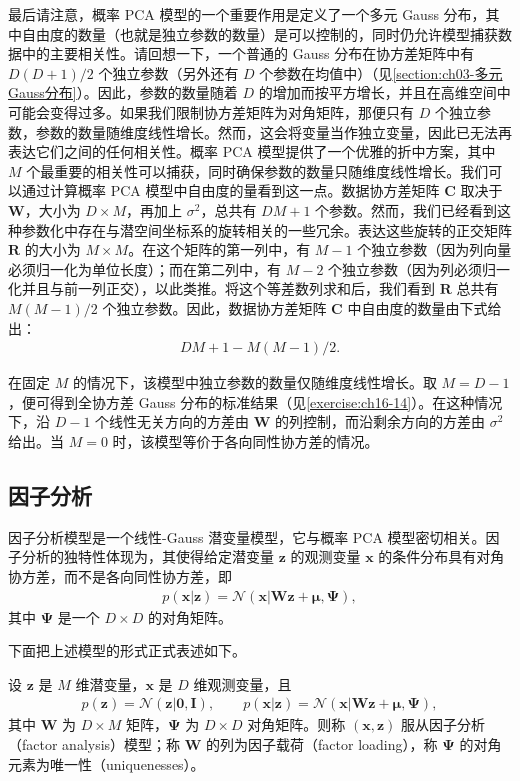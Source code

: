 \documentclass[../../main.tex]{subfiles}
\begin{document}
最后请注意，概率 PCA 模型的一个重要作用是定义了一个多元 Gauss 分布，其中自由度的数量（也就是独立参数的数量）是可以控制的，同时仍允许模型捕获数据中的主要相关性。请回想一下，一个普通的 Gauss 分布在协方差矩阵中有 $D(D+1)/2$ 个独立参数（另外还有 $D$ 个参数在均值中）（见\cref{section:ch03-多元Gauss分布}）。因此，参数的数量随着 $D$ 的增加而按平方增长，并且在高维空间中可能会变得过多。如果我们限制协方差矩阵为对角矩阵，那便只有 $D$ 个独立参数，参数的数量随维度线性增长。然而，这会将变量当作独立变量，因此已无法再表达它们之间的任何相关性。概率 PCA 模型提供了一个优雅的折中方案，其中 $M$ 个最重要的相关性可以捕获，同时确保参数的数量只随维度线性增长。我们可以通过计算概率 PCA 模型中自由度的量看到这一点。数据协方差矩阵 $\bm{C}$ 取决于 $\bm{W}$，大小为 $D\times M$，再加上 $\sigma^2$，总共有 $DM+1$ 个参数。然而，我们已经看到这种参数化中存在与潜空间坐标系的旋转相关的一些冗余。表达这些旋转的正交矩阵 $\bm{R}$ 的大小为 $M\times M$。在这个矩阵的第一列中，有 $M-1$ 个独立参数（因为列向量必须归一化为单位长度）；而在第二列中，有 $M-2$ 个独立参数（因为列必须归一化并且与前一列正交），以此类推。将这个等差数列求和后，我们看到 $\bm{R}$ 总共有 $M(M-1)/2$ 个独立参数。因此，数据协方差矩阵 $\bm{C}$ 中自由度的数量由下式给出：
\begin{align}
  DM+1-M(M-1)/2.
  \label{align:ch16-参数计数}
\end{align}

在固定 $M$ 的情况下，该模型中独立参数的数量仅随维度线性增长。取 $M=D-1$，便可得到全协方差 Gauss 分布的标准结果（见\cref{exercise:ch16-14}）。在这种情况下，沿 $D-1$ 个线性无关方向的方差由 $\bm{W}$ 的列控制，而沿剩余方向的方差由 $\sigma^2$ 给出。当 $M=0$ 时，该模型等价于各向同性协方差的情况。

\subsection{因子分析}\label{subsection:ch16-因子分析}

因子分析模型是一个线性-Gauss 潜变量模型，它与概率 PCA 模型密切相关。因子分析的独特性体现为，其使得给定潜变量 $\bm{z}$ 的观测变量 $\bm{x}$ 的条件分布具有对角协方差，而不是各向同性协方差，即
\begin{align}
  p(\bm{x}|\bm{z})=\mathcal{N}(\bm{x}|\bm{W}\bm{z}+\bm{\mu},\bm{\Psi}),
  \label{align:ch16-因子条件}
\end{align}
其中 $\bm{\Psi}$ 是一个 $D\times D$ 的对角矩阵。

下面把上述模型的形式正式表述如下。

\begin{definition}[因子分析模型]\label{definition:ch16-因子分析}
设 $\bm{z}$ 是 $M$ 维潜变量，$\bm{x}$ 是 $D$ 维观测变量，且
\begin{align*}
  p(\bm{z})=\mathcal{N}(\bm{z}|\bm{0},\bm{I}),\qquad
  p(\bm{x}|\bm{z})=\mathcal{N}(\bm{x}|\bm{W}\bm{z}+\bm{\mu},\bm{\Psi}),
\end{align*}
其中 $\bm{W}$ 为 $D\times M$ 矩阵，$\bm{\Psi}$ 为 $D\times D$ 对角矩阵。则称 $(\bm{x},\bm{z})$ 服从因子分析（factor analysis）模型；称 $\bm{W}$ 的列为因子载荷（factor loading），称 $\bm{\Psi}$ 的对角元素为唯一性（uniquenesses）。
\end{definition}
\end{document}
